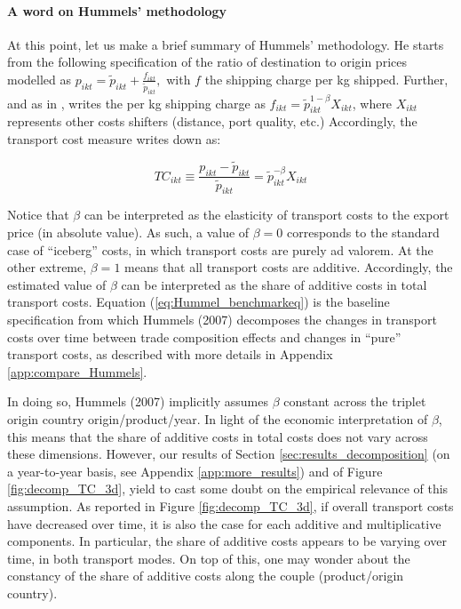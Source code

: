\documentclass[a4paper,11pt]{article}
\begin{document}
\paragraph{A word on Hummels' methodology} At this point, let us make a brief summary of Hummels' methodology\nocite{hummels2007}. He starts from the following specification of the ratio of destination to origin prices modelled as $p_{ikt} = \widetilde{p}_{ikt}+\frac{f_{ikt}}{ \widetilde{p}_{ikt}},$ with $f$ the shipping charge per kg shipped. Further, and as in \cite{hummels_skiba}, \cite{hummels2007} writes the per kg shipping charge as $f_{ikt}=\widetilde{p}_{ikt}^{1-\beta}X_{ikt}$, where $X_{ikt}$ represents other costs shifters (distance, port quality, etc.) Accordingly, the transport cost measure writes down as:

\begin{equation}
TC_{ikt}\equiv \frac{p_{ikt}-\widetilde{p}_{ikt}}{\widetilde{p}_{ikt}} = \widetilde{p}_{ikt}^{-\beta}X_{ikt} \label{eq:Hummel_benchmarkeq}
\end{equation}

Notice that $\beta$ can be interpreted as the elasticity of transport costs to the export price (in absolute value). As such, a value of $\beta = 0$ corresponds to the standard case of ``iceberg'' costs, in which transport costs are purely ad valorem. At the other extreme, $\beta = 1$ means that all transport costs are additive. Accordingly, the estimated value of $\beta$ can be interpreted as the share of additive costs in total transport costs. Equation (\ref{eq:Hummel_benchmarkeq}) is the baseline specification from which Hummels (2007) decomposes the changes in transport costs over time between trade composition effects and changes in ``pure'' transport costs, as described with more details in Appendix \ref{app:compare_Hummels}.

In doing so, Hummels (2007) implicitly assumes $\beta$ constant across the triplet origin country origin/product/year. In light of the economic interpretation of $\beta$, this means that the share of additive costs in total costs does not vary across these dimensions. However, our results of Section \ref{sec:results_decomposition} (on a year-to-year basis, see Appendix \ref{app:more_results}) and of Figure \ref{fig:decomp_TC_3d}, yield to cast some doubt on the empirical relevance of this assumption. As reported in Figure \ref{fig:decomp_TC_3d}, if overall transport costs have decreased over time, it is also the case for each additive and multiplicative components. In particular, the share of additive costs appears to be varying over time, in both transport modes. On top of this, one may wonder about the constancy of the share of additive costs along the couple (product/origin country).
\end{document}
